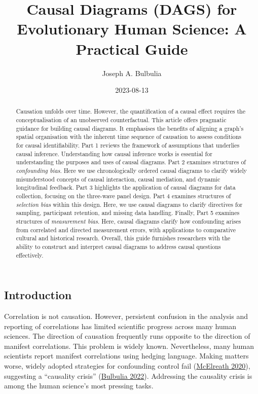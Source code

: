 \documentclass[
  singlecolumn]{article}
\title{Causal Diagrams (DAGS) for Evolutionary Human Science: A
Practical Guide}
\author{Joseph A. Bulbulia}
\affil{%
                  Victoria University of Wellington, New Zealand, School
                  of Psychology, Centre for Applied Cross-Cultural
                  Research
              }
\date{2023-08-13}
\begin{document}
\maketitle
\begin{abstract}
Causation unfolds over time. However, the quantification of a causal
effect requires the conceptualisation of an unobserved counterfactual.
This article offers pragmatic guidance for building causal diagrams. It
emphasises the benefits of aligning a graph's spatial organisation with
the inherent time sequence of causation to assess conditions for causal
identifiability. Part 1 reviews the framework of assumptions that
underlies causal inference. Understanding how causal inference works is
essential for understanding the purposes and uses of causal diagrams.
Part 2 examines structures of \emph{confounding bias}. Here we use
chronologically ordered causal diagrams to clarify widely misunderstood
concepts of causal interaction, causal mediation, and dynamic
longitudinal feedback. Part 3 highlights the application of causal
diagrams for data collection, focusing on the three-wave panel design.
Part 4 examines structures of \emph{selection bias} within this design.
Here, we use causal diagrams to clarify directives for sampling,
participant retention, and missing data handling. Finally, Part 5
examines structures of \emph{measurement bias}. Here, causal diagrams
clarify how confounding arises from correlated and directed measurement
errors, with applications to comparative cultural and historical
research. Overall, this guide furnishes researchers with the ability to
construct and interpret causal diagrams to address causal questions
effectively.
\end{abstract}
\ifdefined\Shaded\renewenvironment{Shaded}{\begin{tcolorbox}[interior hidden, boxrule=0pt, sharp corners, borderline west={3pt}{0pt}{shadecolor}, breakable, frame hidden, enhanced]}{\end{tcolorbox}}\fi

\hypertarget{introduction}{%
\subsection{Introduction}\label{introduction}}

Correlation is not causation. However, persistent confusion in the
analysis and reporting of correlations has limited scientific progress
across many human sciences. The direction of causation frequently runs
opposite to the direction of manifest correlations. This problem is
widely known. Nevertheless, many human scientists report manifest
correlations using hedging language. Making matters worse, widely
adopted strategies for confounding control fail
(\protect\hyperlink{ref-mcelreath2020}{McElreath 2020}), suggesting a
``causality crisis'' (\protect\hyperlink{ref-bulbulia2022}{Bulbulia
2022}). Addressing the causality crisis is among the human science's
most pressing tasks.
\end{document}

